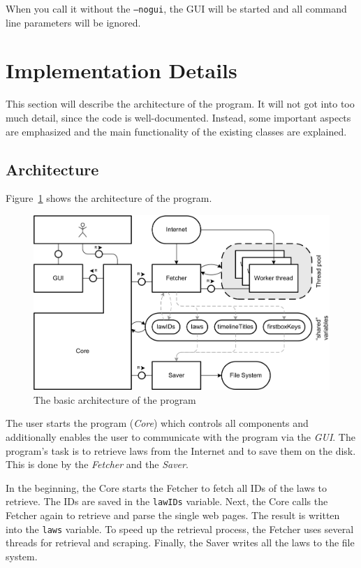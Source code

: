 \documentclass{scrartcl}
\begin{document}
When you call it without the \texttt{---nogui}, the GUI will be started and all command line parameters will be ignored.



\section{Implementation Details}
This section will describe the architecture of the program. It will not got into too much detail, since the code is well-documented. Instead, some important aspects are emphasized and the main functionality of the existing classes are explained.

\subsection{Architecture}
Figure~\ref{Architecture} shows the architecture of the program.

\begin{figure}[ht]
\begin{center}
\includegraphics[width = \textwidth]{Architecture.png}
\caption{The basic architecture of the program}
\label{Architecture}
\end{center}
\end{figure}

The user starts the program (\textit{Core}) which controls all components and additionally enables the user to communicate with the program via the \textit{GUI}. The program's task is to retrieve laws from the Internet and to save them on the disk. This is done by the \textit{Fetcher} and the \textit{Saver}.

In the beginning, the Core starts the Fetcher to fetch all IDs of the laws to retrieve. The IDs are saved in the \texttt{lawIDs} variable. Next, the Core calls the Fetcher again to retrieve and parse the single web pages. The result is written into the \texttt{laws} variable. To speed up the retrieval process, the Fetcher uses several threads for retrieval and scraping. Finally, the Saver writes all the laws to the file system.
\end{document}
